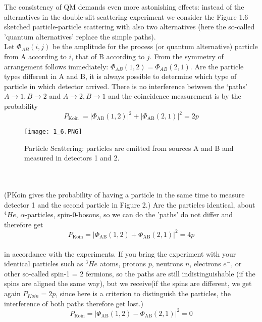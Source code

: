 The consistency of QM demands even more astonishing effects: instead of the alternatives in the double-slit scattering experiment we consider the Figure 1.6 sketched particle-particle scattering with also two alternatives (here the so-called 'quantum alternatives' replace the simple paths).\\
Let $\Phi_{AB}(i, j)$ be the amplitude for the process (or quantum alternative) particle from A according to $i$, that of B according to $j$. From the symmetry of arrangement follows immediately: $\Phi_{AB}(1, 2) = \Phi_{AB}(2, 1)$. Are the particle types different in A and B, it is always possible to determine which type of particle in which detector arrived. There is no interference between the `paths' $A\to 1, B\to 2$ and $A\to 2, B\to 1$ and the coincidence measurement is by the probability
\begin{equation}
P_{\text {Koin }}=\left|\Phi_{\mathrm{AB}}(1,2)\right|^{2}+\left|\Phi_{\mathrm{AB}}(2,1)\right|^{2}=2 p
\end{equation}
\begin{figure}[ht]
    \centering
    \texttt{[image: 1\_6.PNG]}
    \caption{Particle Scattering: particles are emitted from sources A and B and measured in detectors 1 and 2.}
    \label{fig:1.6}
\end{figure}
\\ \\
(PKoin gives the probability of having a particle in the same time to measure detector 1 and the second particle in Figure 2.) Are the particles identical,
about $^{4}He$, $\alpha$-particles, spin-0-bosons, so we can do the 'paths' do not differ and therefore get 
\\
\begin{equation}
P_{\mathrm{Koin}}=\left|\Phi_{\mathrm{AB}}(1,2)+\Phi_{\mathrm{AB}}(2,1)\right|^{2}=4 p
\end{equation}\\
in accordance with the experiments. If you bring the experiment with your identical particles such as $^{3}He$ atoms, protons $p$, neutrons $n$, electrons $e^-$, or other so-called spin-1 = 2 fermions, so the paths are still indistinguishable (if the spins are aligned the same way), but we receive(if the spins are different, we get again $P_{Koin} = 2p$, since here is a criterion to distinguish the particles, the interference of both paths therefore
get lost.)
\\
\begin{equation}
P_{\mathrm{Koin}}=\left|\Phi_{\mathrm{AB}}(1,2)-\Phi_{\mathrm{AB}}(2,1)\right|^{2}=0
\end{equation}\\
